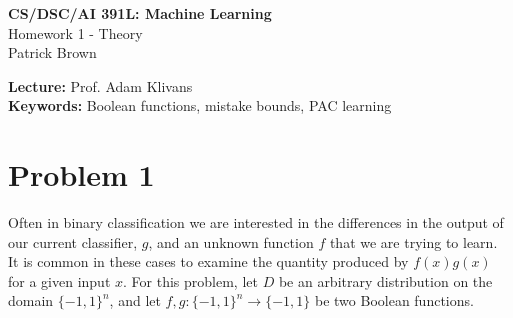 \documentclass{article}
\begin{document}
\begin{center}
    \Large\textbf{CS/DSC/AI 391L: Machine Learning}\\
    \large Homework 1 - Theory\\
    \normalsize Patrick Brown
\end{center}

\noindent\textbf{Lecture:} Prof. Adam Klivans\\
\textbf{Keywords:} Boolean functions, mistake bounds, PAC learning
\vspace{1cm}
\section*{Problem 1}

Often in binary classification we are interested in the differences in the output of our current classifier, $g$, and an unknown function $f$ that we are trying to learn. It is common in these cases to examine the quantity produced by $f(x)g(x)$ for a given input $x$. For this problem, let $D$ be an arbitrary distribution on the domain $\{-1,1\}^n$, and let $f,g : \{-1,1\}^n \to \{-1,1\}$ be two Boolean functions.
\end{document}

